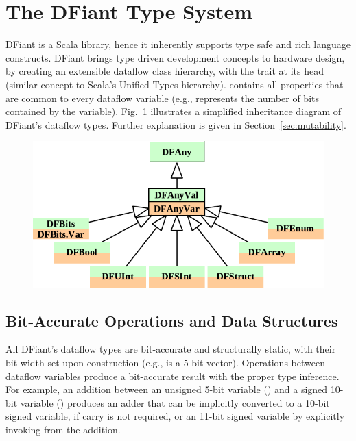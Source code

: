 \section{The DFiant Type System}
\label{sec:type_system}
DFiant is a Scala library, hence it inherently supports type safe and rich language constructs. DFiant brings type driven development concepts to hardware design, by creating an extensible dataflow class hierarchy, with the trait  at its head (similar concept to Scala's Unified Types hierarchy).  contains all properties that are common to every dataflow variable (e.g.,  represents the number of bits contained by the variable). Fig.~\ref{fig:Inherit} illustrates a simplified inheritance diagram of DFiant's dataflow types. Further explanation is given in Section~\ref{sec:mutability}. 

\begin{figure}[h]
	\centering
	\includegraphics[scale=0.7]{graphics/Inherit.pdf} 
	\label{fig:Inherit}
\end{figure}


\vspace*{-4ex}
\subsection{Bit-Accurate Operations and Data Structures}
All DFiant's dataflow types are bit-accurate and structurally static, with their bit-width set upon construction (e.g.,  is a 5-bit vector). Operations between dataflow variables produce a bit-accurate result with the proper type inference. For example, an addition between an unsigned 5-bit variable () and a signed 10-bit variable () produces an adder that can be implicitly converted to a 10-bit signed variable, if carry is not required, or an 11-bit signed variable by explicitly invoking  from the addition.

